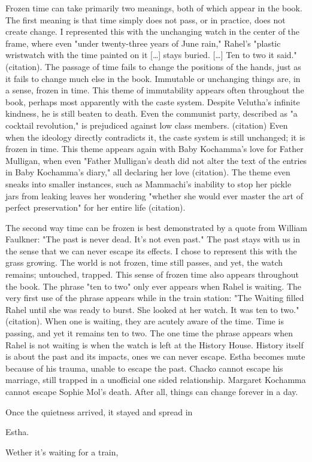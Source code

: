 \documentclass[letterpaper]{article}
\begin{document}
Frozen time can take primarily two meanings, both of which appear in the
book. The first meaning is that time simply does not pass, or in
practice, does not create change. I represented this with the unchanging
watch in the center of the frame, where even "under twenty-three years
of June rain," Rahel's "plastic wristwatch with the time painted on it
[\ldots{}] stays buried. [\ldots{}] Ten to two it said." (citation). The passage
of time fails to change the positions of the hands, just as it fails to
change much else in the book. Immutable or unchanging things are, in a
sense, frozen in time. This theme of immutability appears often
throughout the book, perhaps most apparently with the caste system.
Despite Velutha's infinite kindness, he is still beaten to death. Even
the communist party, described as "a cocktail revolution," is prejudiced
against low class members. (citation) Even when the ideology directly
contradicts it, the caste system is still unchanged; it is frozen in
time. This theme appears again with Baby Kochamma's love for Father
Mulligan, when even "Father Mulligan's death did not alter the text of
the entries in Baby Kochamma's diary," all declaring her love
(citation). The theme even sneaks into smaller instances, such as
Mammachi's inability to stop her pickle jars from leaking leaves her
wondering "whether she would ever master the art of perfect
preservation" for her entire life (citation).

The second way time can be frozen is best demonstrated by a quote from
William Faulkner: "The past is never dead. It's not even past." The past
stays with us in the sense that we can never escape its effects. I chose
to represent this with the grass growing. The world is not frozen, time
still passes, and yet, the watch remains; untouched, trapped. This sense
of frozen time also appears throughout the book. The phrase "ten to two"
only ever appears when Rahel is waiting. The very first use of the
phrase appears while in the train station: "The Waiting filled Rahel
until she was ready to burst. She looked at her watch. It was ten to
two." (citation). When one is waiting, they are acutely aware of the
time. Time is passing, and yet it remains ten to two. The one time the
phrase appears when Rahel is not waiting is when the watch is left at
the History House. History itself is about the past and its impacts,
ones we can never escape. Estha becomes mute because of his trauma,
unable to escape the past. Chacko cannot escape his marriage, still
trapped in a unofficial one sided relationship. Margaret Kochamma cannot
escape Sophie Mol's death. After all, things can change forever in a
day.

Once the quietness arrived, it stayed and spread in

Estha.

Wether it's waiting for a train,
\end{document}
